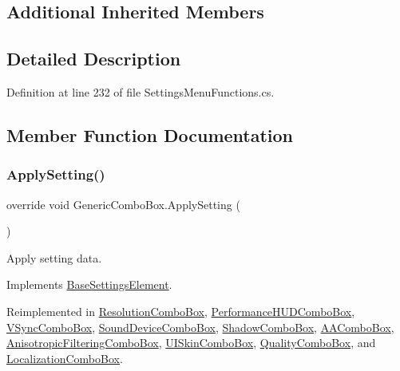 \subsection*{Additional Inherited Members}


\subsection{Detailed Description}


Definition at line 232 of file Settings\+Menu\+Functions.\+cs.



\subsection{Member Function Documentation}
\mbox{\label{class_generic_combo_box_a5aced71f035bd463a4ebaaffe19ec547}} 
\subsubsection{\texorpdfstring{Apply\+Setting()}{ApplySetting()}}
{\footnotesize\ttfamily override void Generic\+Combo\+Box.\+Apply\+Setting (\begin{DoxyParamCaption}{ }\end{DoxyParamCaption})\hspace{0.3cm}{\ttfamily [virtual]}}



Apply setting data. 



Implements \hyperlink{class_base_settings_element_aecb484325110e7b97ec6e4d92d856ab1}{Base\+Settings\+Element}.



Reimplemented in \hyperlink{class_resolution_combo_box_ae2069c493be08045148b0e260b2112c9}{Resolution\+Combo\+Box}, \hyperlink{class_performance_h_u_d_combo_box_a80ec71a44640dad18ea4da16ecb39fb7}{Performance\+H\+U\+D\+Combo\+Box}, \hyperlink{class_v_sync_combo_box_a5d6d9a0895ae75f608a7107ce1ef5d31}{V\+Sync\+Combo\+Box}, \hyperlink{class_sound_device_combo_box_a93dba6ff0e9ebd8767b9e15551231747}{Sound\+Device\+Combo\+Box}, \hyperlink{class_shadow_combo_box_a9289f25b57e2935f1b971ec9875218d8}{Shadow\+Combo\+Box}, \hyperlink{class_a_a_combo_box_a449a6201d1e2c9e612b49bce29c1c151}{A\+A\+Combo\+Box}, \hyperlink{class_anisotropic_filtering_combo_box_a6125f1d23556243c2b50ff1063cd8a3b}{Anisotropic\+Filtering\+Combo\+Box}, \hyperlink{class_u_i_skin_combo_box_a6995ec911a8cacc899e3c44aa3099fff}{U\+I\+Skin\+Combo\+Box}, \hyperlink{class_quality_combo_box_a6f05c237068e72d2221a58425d17f402}{Quality\+Combo\+Box}, and \hyperlink{class_localization_combo_box_ad531f8563cc8085e0129d4d719f8f82b}{Localization\+Combo\+Box}.



